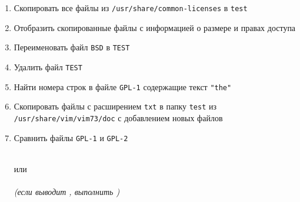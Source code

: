 \documentclass[a4paper,12pt]{article}
\begin{document}
\begin{flushleft}
\begin{enumerate}
\begin{enumerate} [\bf a. ]
                \begin{flushleft}
                \end{flushleft}
                \item Скопировать все файлы из \texttt{/usr/share/common-licenses} в \texttt{test}
                \begin{flushleft}
                \end{flushleft}
                \item Отобразить скопированные файлы с информацией о размере и правах доступа
                \begin{flushleft}
                \end{flushleft}
                \item Переименовать файл \texttt{BSD} в \texttt{TEST}
                \begin{flushleft}
                \end{flushleft}
                \item Удалить файл \texttt{TEST}
                \begin{flushleft}
                \end{flushleft}
                \item Найти номера строк в файле \texttt{GPL-1} содержащие текст \texttt{"the"}
                \begin{flushleft}
                \end{flushleft}
                \item Скопировать файлы с расширением \texttt{txt} в папку \texttt{test} из \texttt{/usr/share/vim/vim73/doc} с добавлением новых файлов
                \begin{flushleft}
                \end{flushleft}
                \item Сравнить файлы \texttt{GPL-1} и \texttt{GPL-2}
                \begin{flushleft}
                    \\
                    или\\
                    \\
                    \textit{(если выводит , выполнить )}

\end{flushleft}
\end{enumerate}
\end{enumerate}
\end{flushleft}
\end{document}
